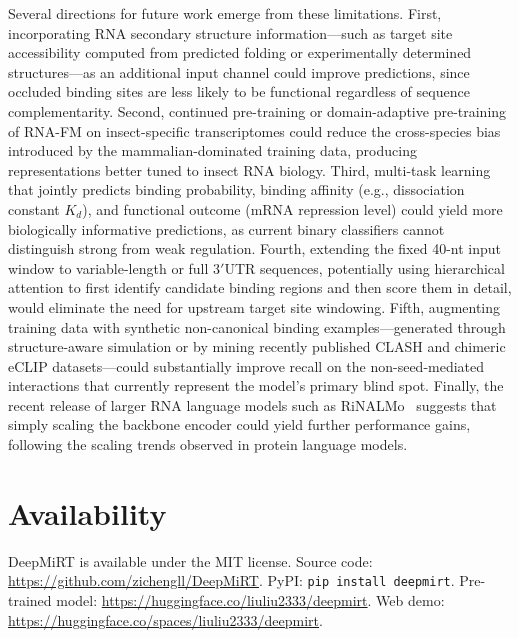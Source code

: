 \documentclass[10pt,a4paper]{article}
\begin{document}
Several directions for future work emerge from these limitations. First, incorporating RNA secondary structure information---such as target site accessibility computed from predicted folding or experimentally determined structures---as an additional input channel could improve predictions, since occluded binding sites are less likely to be functional regardless of sequence complementarity. Second, continued pre-training or domain-adaptive pre-training of RNA-FM on insect-specific transcriptomes could reduce the cross-species bias introduced by the mammalian-dominated training data, producing representations better tuned to insect RNA biology. Third, multi-task learning that jointly predicts binding probability, binding affinity (e.g., dissociation constant $K_d$), and functional outcome (mRNA repression level) could yield more biologically informative predictions, as current binary classifiers cannot distinguish strong from weak regulation. Fourth, extending the fixed 40-nt input window to variable-length or full 3$'$UTR sequences, potentially using hierarchical attention to first identify candidate binding regions and then score them in detail, would eliminate the need for upstream target site windowing. Fifth, augmenting training data with synthetic non-canonical binding examples---generated through structure-aware simulation or by mining recently published CLASH and chimeric eCLIP datasets---could substantially improve recall on the non-seed-mediated interactions that currently represent the model's primary blind spot. Finally, the recent release of larger RNA language models such as RiNALMo~\citep{rinalmo2025} suggests that simply scaling the backbone encoder could yield further performance gains, following the scaling trends observed in protein language models.

\section*{Availability}

DeepMiRT is available under the MIT license. Source code: \url{https://github.com/zichengll/DeepMiRT}. PyPI: \texttt{pip install deepmirt}. Pre-trained model: \url{https://huggingface.co/liuliu2333/deepmirt}. Web demo: \url{https://huggingface.co/spaces/liuliu2333/deepmirt}.

\end{document}

